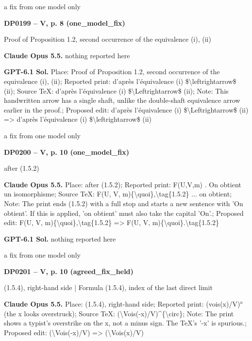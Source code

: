 a fix from one model only\par
\par\noindent\hypertarget{DP0199}{}\textbf{DP0199 -- V, p. 8 (one\_model\_fix)}\par
Proof of Proposition 1.2, second occurrence of the equivalence (i), (ii)\par
\textbf{Claude Opus 5.5.} nothing reported here\par
\textbf{GPT-6.1 Sol.} Place: Proof of Proposition 1.2, second occurrence of the equivalence (i), (ii); Reported print: d'après l'équivalence (i) \$\textbackslash{}leftrightarrow\$ (ii); Source TeX: d'après l'équivalence (i) \$\textbackslash{}Leftrightarrow\$ (ii); Note: This handwritten arrow has a single shaft, unlike the double-shaft equivalence arrow earlier in the proof.; Proposed edit: d'après l'équivalence (i) \$\textbackslash{}Leftrightarrow\$ (ii) =\allowbreak > d'après l'équivalence (i) \$\textbackslash{}leftrightarrow\$ (ii)\par
a fix from one model only\par
\par\noindent\hypertarget{DP0200}{}\textbf{DP0200 -- V, p. 10 (one\_model\_fix)}\par
after (1.5.2)\par
\textbf{Claude Opus 5.5.} Place: after (1.5.2); Reported print: F(U,V,m) .  On obtient un isomorphisme; Source TeX: F(U, V, m)\{\textbackslash{}quoi\},\textbackslash{}tag\{1.5.2\} ... on obtient; Note: The print ends (1.5.2) with a full stop and starts a new sentence with 'On obtient'. If this is applied, 'on obtient' must also take the capital 'On'.; Proposed edit: F(U, V, m)\{\textbackslash{}quoi\},\textbackslash{}tag\{1.5.2\} =\allowbreak > F(U, V, m)\{\textbackslash{}quoi\}.\textbackslash{}tag\{1.5.2\}\par
\textbf{GPT-6.1 Sol.} nothing reported here\par
a fix from one model only\par
\par\noindent\hypertarget{DP0201}{}\textbf{DP0201 -- V, p. 10 (agreed\_fix\_held)}\par
(1.5.4), right-hand side | Formula (1.5.4), index of the last direct limit\par
\textbf{Claude Opus 5.5.} Place: (1.5.4), right-hand side; Reported print: (vois(x)/V)° (the x looks overstruck); Source TeX: (\textbackslash{}Vois(-x)/V)\textasciicircum{}\{\textbackslash{}circ\}; Note: The print shows a typist's overstrike on the x, not a minus sign. The TeX's '-x' is spurious.; Proposed edit: (\textbackslash{}Vois(-x)/V) =\allowbreak > (\textbackslash{}Vois(x)/V)\par
